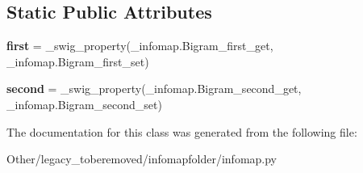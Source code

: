 \subsection*{Static Public Attributes}
\begin{DoxyCompactItemize}
\item 
\mbox{\label{classinfomapfolder_1_1infomap_1_1Bigram_a69dfb62b6150eb5b163422e13daa40e7}} 
{\bfseries first} = \+\_\+swig\+\_\+property(\+\_\+infomap.\+Bigram\+\_\+first\+\_\+get, \+\_\+infomap.\+Bigram\+\_\+first\+\_\+set)
\item 
\mbox{\label{classinfomapfolder_1_1infomap_1_1Bigram_a36299e7bf6a032fea63768b3e472d427}} 
{\bfseries second} = \+\_\+swig\+\_\+property(\+\_\+infomap.\+Bigram\+\_\+second\+\_\+get, \+\_\+infomap.\+Bigram\+\_\+second\+\_\+set)
\end{DoxyCompactItemize}


The documentation for this class was generated from the following file\+:\begin{DoxyCompactItemize}
\item 
Other/legacy\+\_\+toberemoved/infomapfolder/infomap.\+py\end{DoxyCompactItemize}
